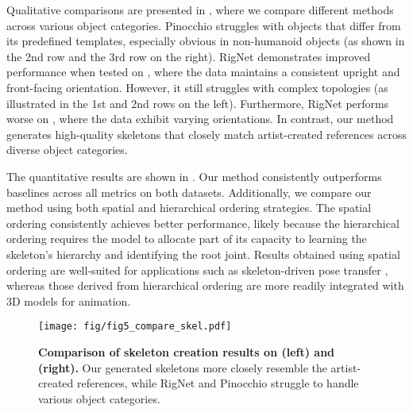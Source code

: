 Qualitative comparisons are presented in , where we compare different methods across various object categories.  
Pinocchio struggles with objects that differ from its predefined templates, especially obvious in non-humanoid objects (as shown in the 2nd row and the 3rd row on the right).
RigNet demonstrates improved performance when tested on \res{}, where the data maintains a consistent upright and front-facing orientation. However, it still struggles with complex topologies (as illustrated in the 1st and 2nd rows on the left). Furthermore, RigNet performs worse on \ourdata{}, where the data exhibit varying orientations. 
In contrast, our method generates high-quality skeletons that closely match artist-created references across diverse object categories.


The quantitative results are shown in . Our method consistently outperforms baselines across all metrics on both datasets. Additionally, we compare our method using both spatial and hierarchical ordering strategies. The spatial ordering consistently achieves better performance, likely because the hierarchical ordering requires the model to allocate part of its capacity to learning the skeleton’s hierarchy and identifying the root joint. Results obtained using spatial ordering are well-suited for applications such as skeleton-driven pose transfer \cite{zhang2024magicpose4d}, whereas those derived from hierarchical ordering are more readily integrated with 3D models for animation.


\begin{figure*}
  \centering
  \texttt{[image: fig/fig5\_compare\_skel.pdf]}
  \vspace{-10pt}
  \caption{\textbf{Comparison of skeleton creation results on \res{} (left) and \ourdata{} (right).} Our generated skeletons more closely resemble the artist-created references, while RigNet and Pinocchio struggle to handle various object categories. }
  \label{compare_skel}
  \vspace{-15pt}
\end{figure*}


